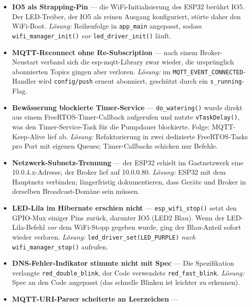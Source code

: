 \documentclass[a4paper,12pt]{article}
\begin{document}
\begin{itemize}
  \item \textbf{IO5 als Strapping-Pin} --- die WiFi-Initialisierung
        des ESP32 berührt IO5. Der LED-Treiber, der IO5 als reinen
        Ausgang konfiguriert, störte daher den WiFi-Boot. \emph{Lösung:}
        Reihenfolge in \texttt{app\_main} angepasst, sodass
        \texttt{wifi\_manager\_init()} \emph{vor}
        \texttt{led\_driver\_init()} läuft.
  \item \textbf{MQTT-Reconnect ohne Re-Subscription} --- nach einem
        Broker-Neustart verband sich die esp-mqtt-Library zwar wieder,
        die ursprünglich abonnierten Topics gingen aber verloren.
        \emph{Lösung:} im \texttt{MQTT\_EVENT\_CONNECTED}-Handler
        wird \texttt{config/push} erneut abonniert, geschützt durch
        ein \texttt{s\_running}-Flag.
  \item \textbf{Bewässerung blockierte Timer-Service} ---
        \texttt{do\_watering()} wurde direkt aus einem
        FreeRTOS-Timer-Callback aufgerufen und nutzte
        \texttt{vTaskDelay()}, was den Timer-Service-Task für die
        Pumpdauer blockierte. Folge: MQTT-Keep-Alive lief ab.
        \emph{Lösung:} Refaktorierung in zwei dedizierte
        FreeRTOS-Tasks pro Port mit eigenen Queues; Timer-Callbacks
        schicken nur Befehle.
  \item \textbf{Netzwerk-Subnetz-Trennung} --- der ESP32 erhielt im
        Gastnetzwerk eine 10.0.4.x-Adresse, der Broker lief auf
        10.0.0.80. \emph{Lösung:} ESP32 mit dem Hauptnetz verbinden;
        längerfristig dokumentieren, dass Geräte und Broker in
        derselben Broadcast-Domäne sein müssen.
  \item \textbf{LED-Lila im Hibernate erschien nicht} ---
        \texttt{esp\_wifi\_stop()} setzt den GPIO-Mux einiger Pins
        zurück, darunter IO5 (LED2 Blau). Wenn der LED-Lila-Befehl
        \emph{vor} dem WiFi-Stopp gegeben wurde, ging der
        Blau-Anteil sofort wieder verloren. \emph{Lösung:}
        \texttt{led\_driver\_set(LED\_PURPLE)} \emph{nach}
        \texttt{wifi\_manager\_stop()} aufrufen.
  \item \textbf{DNS-Fehler-Indikator stimmte nicht mit Spec} ---
        Die Spezifikation verlangte \texttt{red\_double\_blink},
        der Code verwendete \texttt{red\_fast\_blink}. \emph{Lösung:}
        Spec an den Code angepasst (das schnelle Blinken ist
        leichter zu erkennen).
  \item \textbf{MQTT-URI-Parser scheiterte an Leerzeichen} ---

\end{itemize}
\end{document}
